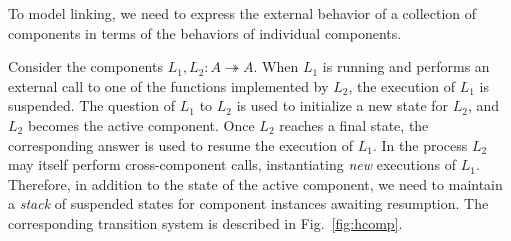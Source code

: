 \documentclass[draft,11pt]{report}
\begin{document}
To model linking,
we need to express the external behavior
of a collection of components
in terms of the behaviors of
individual components.

Consider the components $L_1, L_2 : A \twoheadrightarrow A$.
When $L_1$ is running and performs an external call
to one of the functions implemented by $L_2$,
the execution of $L_1$ is suspended.
The question of $L_1$ to $L_2$
is used to initialize a new state for $L_2$,
and $L_2$ becomes the active component.
Once $L_2$ reaches a final state,
the corresponding answer is used to resume
the execution of $L_1$.
In the process
$L_2$ may itself perform cross-component calls,
instantiating \emph{new} executions of $L_1$.
Therefore,
in addition to the state of the active component,
we need to maintain a \emph{stack} of suspended states
for component instances awaiting resumption.
The corresponding transition system
is described in Fig.~\ref{fig:hcomp}.
\end{document}
